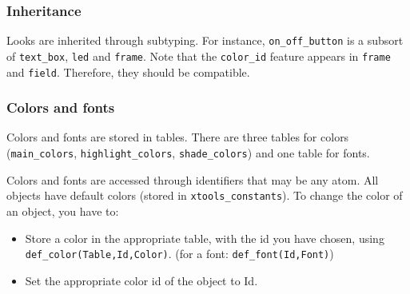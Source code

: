 
  \subsubsection{Inheritance}

    Looks are inherited through subtyping. For instance, \verb+on_off_button+ 
    is a  subsort of \verb+text_box+, {\tt led} and {\tt frame}. Note
    that the \verb+color_id+ 
    feature appears in {\tt frame} and {\tt field}. Therefore, they should be
    compatible.


  \subsubsection{Colors and fonts}

    Colors and fonts are stored in tables.
    There are three tables for colors
    (\verb+main_colors+, \verb+highlight_colors+, \verb+shade_colors+)
    and one table for fonts.  
  
    Colors and fonts are accessed through identifiers that may
    be any atom. All objects have default colors (stored in
    \verb+xtools_constants+). To change the color of an object, you have to:
    \begin{itemize}
    \item Store a color in the appropriate table, with the id you have  
          chosen, using \verb+def_color(Table,Id,Color)+.
          (for a font: \verb+def_font(Id,Font)+)
    \item Set the appropriate color id of the object to Id.
    \end{itemize}

